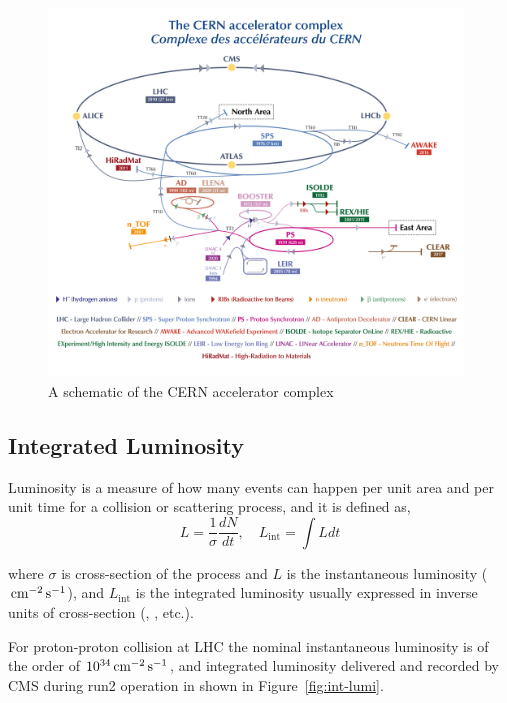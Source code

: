 \begin{figure}[!ht]
  \centering
  \includegraphics[width=0.98\textwidth]{figures/lhc-scheme.png}
  \caption[A schematic of the CERN accelerator complex]%
  {A schematic of the CERN accelerator complex~\cite{image-lhc-scheme}}%
  \label{fig:lhc}
\end{figure}

\subsection{
  Integrated Luminosity
}\label{ch_cms:cms-lumi}

Luminosity is a measure of how many events can happen per unit area and per
unit time for a collision or scattering process, and it is defined as,
%
\begin{equation}
  L = \frac{1}{\sigma} \frac{dN}{dt}, \quad L_{\text{int}} = \int L dt
\end{equation}

where \(\sigma \) is cross-section of the process
and \(L\) is the instantaneous luminosity (\( \,\text{cm}{}^{-2} \,\text{s}^{-1} \)),
and \( L_{\text{int}} \) is the integrated luminosity usually
expressed in inverse units of cross-section (\pbinv{}, \fbinv{}, etc.).

For proton-proton collision at \gls{LHC}
the nominal instantaneous luminosity is of the order of \( 10^{34} \,\text{cm}{}^{-2} \,\text{s}^{-1}\),
and integrated luminosity delivered and recorded by \gls{CMS} during run2 operation
in shown in Figure~\ref{fig:int-lumi}.

